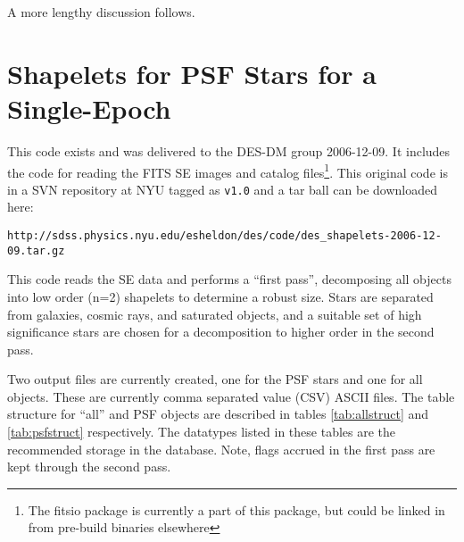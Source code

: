 \documentclass[12pt]{article}
\begin{document}
{\noindent A more lengthy discussion follows.}

\section{Shapelets for PSF Stars for a Single-Epoch} \label{sec:sepsf}


This code exists and was delivered to the DES-DM group 2006-12-09.  It includes
the code for reading the FITS SE images and catalog files\footnote{The fitsio
package is currently a part of this package, but could be linked in from
pre-build binaries elsewhere}.  This original code is in a SVN repository at
NYU tagged as \texttt{v1.0} and a tar ball can be downloaded here:
\begin{verbatim}
http://sdss.physics.nyu.edu/esheldon/des/code/des_shapelets-2006-12-09.tar.gz
\end{verbatim}

This code reads the SE data and performs a ``first pass'', decomposing all
objects into low order (n=2) shapelets to determine a robust size. Stars are
separated from galaxies, cosmic rays, and saturated objects, and a suitable set
of high significance stars are chosen for a decomposition to higher order
in the second pass.

Two output files are currently created, one for the PSF stars and one for all
objects.  These are currently comma separated value (CSV) ASCII files.  The
table structure for ``all'' and PSF objects are described in tables
\ref{tab:allstruct} and \ref{tab:psfstruct} respectively.  The datatypes listed
in these tables are the recommended storage in the database. Note, flags
accrued in the first pass are kept through the second pass.
\end{document}

